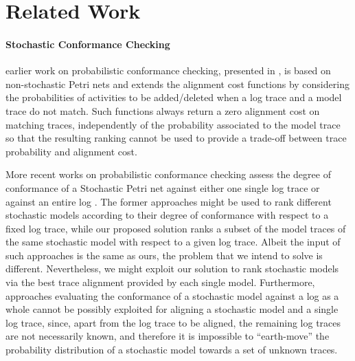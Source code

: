 \section{Related Work}
\paragraph*{Stochastic Conformance Checking} earlier work on probabilistic conformance checking, presented in \cite{AlizadehLZ14a}, is based on non-stochastic Petri nets and extends the alignment cost functions by considering the probabilities of activities to be added/deleted when a log trace and a model trace do not match. Such functions always return a zero alignment cost on matching traces, independently of the probability associated to the model trace so that the resulting ranking cannot be used to provide a trade-off between trace probability and alignment cost.

More recent works on probabilistic conformance checking assess the degree of conformance of a Stochastic Petri net against either one single log trace \cite{DBLP:conf/icpm/PolyvyanyyK19,DBLP:journals/tosem/PolyvyanyySWCM20} or against an entire log \cite{LeemansSA19}. %
The former approaches might be used to rank different stochastic models according to their degree of conformance with respect to a fixed log trace, while our proposed solution ranks a subset of the model traces of the same stochastic model with respect to a given log trace. Albeit the input of such approaches is the same as ours, the problem that we intend to solve is different. Nevertheless, we might exploit our solution to rank stochastic models via the best trace alignment provided by each single model. Furthermore, approaches evaluating the conformance of a stochastic model against a log as a whole cannot be possibly exploited for aligning a stochastic model and a single log trace, since, apart from the log trace to be aligned, the remaining log traces are not necessarily known, and therefore it is impossible to ``earth-move'' the probability distribution of a stochastic model towards a set of unknown traces.


